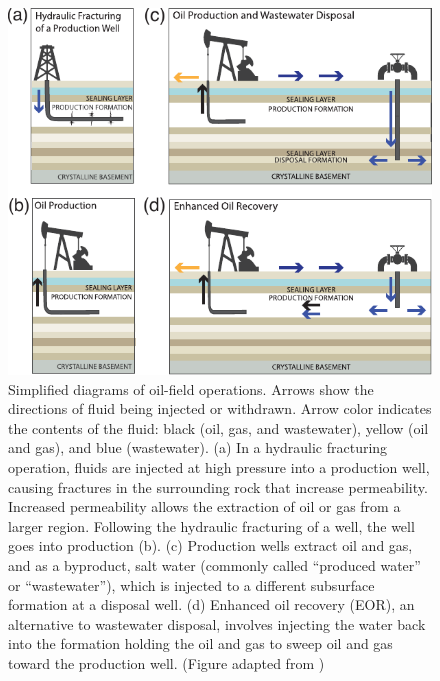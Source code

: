 \begin{figure}
	\centering
	\includegraphics[width=\linewidth]{figures/chapter2-permian/oil-page-square.pdf}
	\caption[Diagram of unconventional oil production operations]{
		Simplified diagrams of oil-field operations. Arrows show the directions of fluid being injected or withdrawn. Arrow color indicates the contents of the fluid: black (oil, gas, and wastewater), yellow (oil and gas), and blue (wastewater). 
		(a) In a hydraulic fracturing operation, fluids are injected at high pressure into a production well, causing fractures in the surrounding rock that increase permeability. Increased permeability allows the extraction of oil or gas from a larger region. Following the hydraulic fracturing of a well, the well goes into production (b). 
		(c) Production wells extract oil and gas, and as a byproduct, salt water (commonly called ``produced water'' or ``wastewater''), which is injected to a different subsurface formation at a disposal well. 
		(d) Enhanced oil recovery (EOR), an alternative to wastewater disposal, involves injecting the water back into the formation holding the oil and gas to sweep oil and gas toward the production well.
		(Figure adapted from \citep{Rubinstein2015MythsFactsWastewater})
	}
	\label{fig:oil-drilling}
\end{figure}




